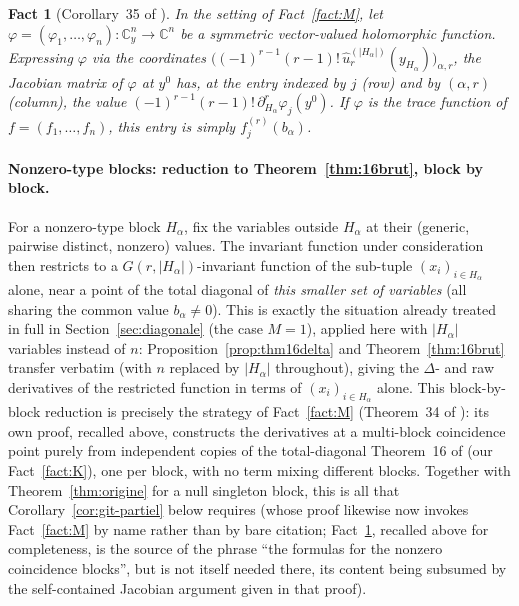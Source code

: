 \documentclass[11pt]{article}
\newtheorem{fact}[theorem]{Fact}
\theoremstyle{remark}
\newcommand{\CC}{\mathbb{C}}
\begin{document}
\begin{fact}[Corollary~35 of \cite{Ze}]\label{fact:N}
In the setting of Fact~\ref{fact:M}, let $\varphi=(\varphi_1,\dots,\varphi_n):\CC^n_y\to\CC^n$ be a symmetric vector-valued holomorphic function. Expressing $\varphi$ via the coordinates $\big((-1)^{r-1}(r-1)!\,\hat u_r^{(|H_\alpha|)}(y_{H_\alpha})\big)_{\alpha,r}$, the Jacobian matrix of $\varphi$ at $y^0$ has, at the entry indexed by $j$ (row) and by $(\alpha,r)$ (column), the value $(-1)^{r-1}(r-1)!\,\partial_{H_\alpha}^r\varphi_j(y^0)$. If $\varphi$ is the trace function of $f=(f_1,\dots,f_n)$, this entry is simply $f_j^{(r)}(b_\alpha)$.
\end{fact}

\paragraph{Nonzero-type blocks: reduction to Theorem~\ref{thm:16brut}, block by block.} For a nonzero-type block $H_\alpha$, fix the variables outside $H_\alpha$ at their (generic, pairwise distinct, nonzero) values. The invariant function under consideration then restricts to a $G(r,|H_\alpha|)$-invariant function of the sub-tuple $(x_i)_{i\in H_\alpha}$ alone, near a point of the total diagonal of \emph{this smaller set of variables} (all sharing the common value $b_\alpha\ne0$). This is exactly the situation already treated in full in Section~\ref{sec:diagonale} (the case $M=1$), applied here with $|H_\alpha|$ variables instead of $n$: Proposition~\ref{prop:thm16delta} and Theorem~\ref{thm:16brut} transfer verbatim (with $n$ replaced by $|H_\alpha|$ throughout), giving the $\Delta$- and raw derivatives of the restricted function in terms of $(x_i)_{i\in H_\alpha}$ alone. This block-by-block reduction is precisely the strategy of Fact~\ref{fact:M} (Theorem~34 of \cite{Ze}): its own proof, recalled above, constructs the derivatives at a multi-block coincidence point purely from independent copies of the total-diagonal Theorem~16 of \cite{Ze} (our Fact~\ref{fact:K}), one per block, with no term mixing different blocks. Together with Theorem~\ref{thm:origine} for a null singleton block, this is all that Corollary~\ref{cor:git-partiel} below requires (whose proof likewise now invokes Fact~\ref{fact:M} by name rather than by bare citation; Fact~\ref{fact:N}, recalled above for completeness, is the source of the phrase ``the formulas for the nonzero coincidence blocks'', but is not itself needed there, its content being subsumed by the self-contained Jacobian argument given in that proof).
\end{document}
